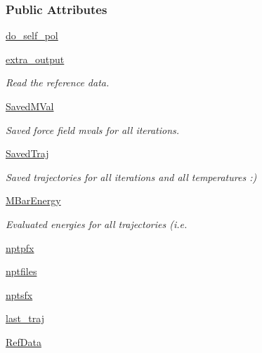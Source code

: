 \subsubsection*{\-Public \-Attributes}
\begin{DoxyCompactItemize}
\item 
\hyperlink{classforcebalance_1_1liquid_1_1Liquid_af7ba85e825dfe42a384c2eb2e7cc1f0c}{do\-\_\-self\-\_\-pol}
\item 
\hyperlink{classforcebalance_1_1liquid_1_1Liquid_a3d7e00beaf0c7d71751699e05b87c501}{extra\-\_\-output}
\begin{DoxyCompactList}\small\item\em \-Read the reference data. \end{DoxyCompactList}\item 
\hyperlink{classforcebalance_1_1liquid_1_1Liquid_a110998789cb046248b78318c97872930}{\-Saved\-M\-Val}
\begin{DoxyCompactList}\small\item\em \-Saved force field mvals for all iterations. \end{DoxyCompactList}\item 
\hyperlink{classforcebalance_1_1liquid_1_1Liquid_acab3a497d408af6d152a460ecba40583}{\-Saved\-Traj}
\begin{DoxyCompactList}\small\item\em \-Saved trajectories for all iterations and all temperatures \-:) \end{DoxyCompactList}\item 
\hyperlink{classforcebalance_1_1liquid_1_1Liquid_a92ec9101fdcdadf9c9a3975bac0b409e}{\-M\-Bar\-Energy}
\begin{DoxyCompactList}\small\item\em \-Evaluated energies for all trajectories (i.\-e. \end{DoxyCompactList}\item 
\hyperlink{classforcebalance_1_1liquid_1_1Liquid_a2e379d0030f788029f9778b33f456cb8}{nptpfx}
\item 
\hyperlink{classforcebalance_1_1liquid_1_1Liquid_a748b44c6ea59a4a79bc8413e5d64b88a}{nptfiles}
\item 
\hyperlink{classforcebalance_1_1liquid_1_1Liquid_a13401c3bd91481f840975e95770c107d}{nptsfx}
\item 
\hyperlink{classforcebalance_1_1liquid_1_1Liquid_acf4158ed2337a04bdee3ee3f2f16283c}{last\-\_\-traj}
\item 
\hyperlink{classforcebalance_1_1liquid_1_1Liquid_a2567b4431d446cbe76e491c00ac9b6c1}{\-Ref\-Data}

\end{DoxyCompactItemize}

